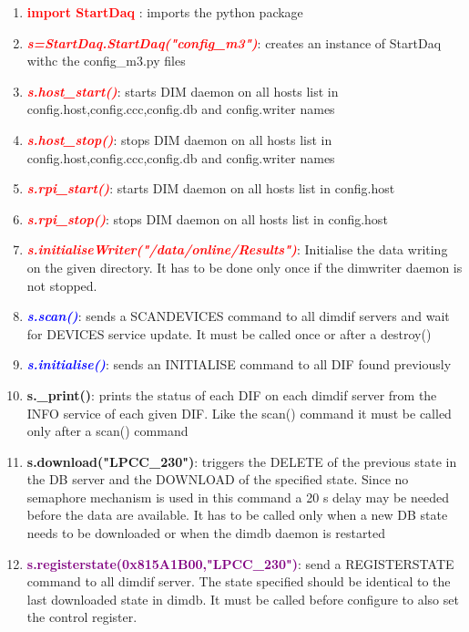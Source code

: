 \documentclass[english]{article}
\begin{document}
\begin{enumerate} 
\item \textcolor{red}{ \bf  import StartDaq} :  imports the python package

\item \textcolor{red}{\it \bf s=StartDaq.StartDaq("config\_m3")}:  creates an instance of StartDaq withc the config\_m3.py files

\item \textcolor{red}{\it \bf s.host\_start()}: starts DIM daemon on all hosts list in config.host,config.ccc,config.db and config.writer names 
\item \textcolor{red}{\it \bf s.host\_stop()}: stops DIM daemon on all hosts list in config.host,config.ccc,config.db and config.writer names
 \item \textcolor{red}{\it \bf s.rpi\_start()}: starts DIM daemon on all hosts list in config.host
\item \textcolor{red}{\it \bf s.rpi\_stop()}: stops DIM daemon on all hosts list in config.host

\item \textcolor{red}{\it \bf s.initialiseWriter("/data/online/Results")}: Initialise the data writing on the given directory. It has to be done only once if the dimwriter daemon is not stopped.

\item \textcolor{blue}{\it \bf s.scan()}: sends a SCANDEVICES command to all dimdif servers and wait for DEVICES service update. It must be called once or after a destroy()


\item \textcolor{blue}{\it {\bf s.initialise()}}: sends an INITIALISE command to all DIF found previously
\item {\bf s.\_print()}: prints the status of each DIF on each dimdif server from the INFO service of each given DIF. Like the scan() command it must be called only after a scan() command

\item {\bf s.download("LPCC\_230")}: triggers the DELETE of the previous state in the DB server and the DOWNLOAD of the specified state. Since no semaphore mechanism is used in this command a 20 s delay may be needed before the data are available. It has to be called only when a new DB state needs to be downloaded or when the dimdb daemon is restarted

\item \textcolor{purple}{\bf s.registerstate(0x815A1B00,"LPCC\_230")}: send a REGISTERSTATE command to all dimdif server. The state specified should be identical to the last downloaded state in dimdb. It must be called before configure to also set the control register.


\end{enumerate}
\end{document}
